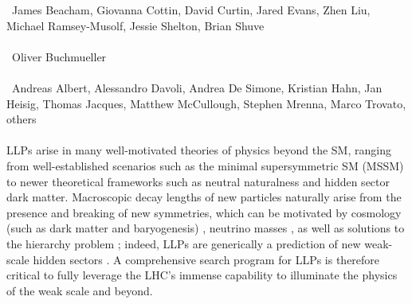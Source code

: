 ~James Beacham, Giovanna Cottin, David Curtin, Jared Evans, Zhen Liu, Michael Ramsey-Musolf, Jessie Shelton, Brian Shuve \\
\text{ \; }\\
~Oliver Buchmueller \\
\text{ \; }\\
~Andreas Albert, Alessandro Davoli, Andrea De Simone, Kristian Hahn, Jan Heisig, Thomas Jacques, Matthew McCullough, Stephen Mrenna, Marco Trovato, others
\text{ \; }\\
\text{ \; }\\


\noindent LLPs arise in many well-motivated theories of physics beyond the SM, ranging from  well-established scenarios such as the minimal supersymmetric  SM (MSSM) to newer theoretical frameworks such as neutral naturalness and hidden sector dark matter.  Macroscopic decay lengths of new particles naturally arise from the presence and breaking of new symmetries, which can be motivated by cosmology (such as dark matter and baryogenesis) \cite{Bouquet:1986mq, Campbell:1990fa, Cui:2012jh, Barry:2013nva, Cui:2014twa, Ipek:2016bpf,Baumgart:2009tn, Kaplan:2009ag,
  Chan:2011aa, Dienes:2011ja, Dienes:2012yz, Kim:2013ivd}, neutrino masses \cite{Helo:2013esa, Antusch:2016vyf,Graesser:2007yj, Graesser:2007pc, Izaguirre:2015pga,Maiezza:2015lza, Batell:2016zod,Cottin:2018kmq,Nemevsek:2018bbt}, as well as solutions to the hierarchy problem  \cite{Giudice:1998bp,Burdman:2006tz, Cai:2008au, Chacko:2005pe,Fan:2011yu,Barbier:2004ez, Csaki:2013jza,Arvanitaki:2012ps, ArkaniHamed:2012gw}; indeed, LLPs are generically a prediction of new weak-scale hidden sectors \cite{Chen:1995yu,Thomas:1998wy,Feng:1999fu,Strassler:2006im,Strassler:2006ri,Strassler:2006qa,Han:2007ae,Strassler:2008bv,Strassler:2008fv}.  A comprehensive search program for LLPs is therefore critical to fully leverage the LHC's immense capability to illuminate the physics of the weak scale and beyond. 
  
